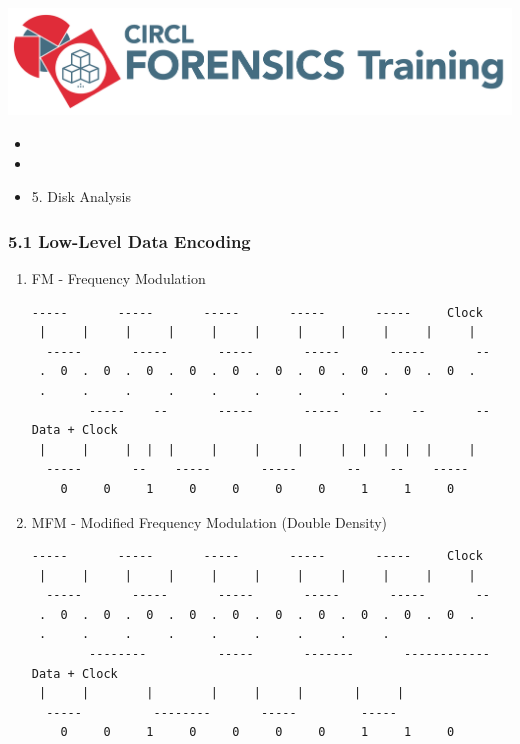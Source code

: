 %
%



\begin{frame}
    \includegraphics[scale=0.3]{images/logo-circl-Forensics.png}
    \begin{itemize}
        \item[]
        \item[]
        \item[] 5. Disk Analysis
    \end{itemize}
\end{frame}


\begin{frame}[fragile]
  \frametitle{5.1 Low-Level Data Encoding}
        \begin{enumerate}
            \item FM - Frequency Modulation
\begin{lstlisting}[basicstyle=\tiny]
        -----       -----       -----       -----       -----     Clock
 |     |     |     |     |     |     |     |     |     |     |
  -----       -----       -----       -----       -----       --
 .  0  .  0  .  0  .  0  .  0  .  0  .  0  .  0  .  0  .  0  .  
 .     .     .     .     .     .     .     .     .
        -----    --       -----       -----    --    --       --  Data + Clock
 |     |     |  |  |     |     |     |     |  |  |  |  |     |
  -----       --    -----       -----       --    --    -----
    0     0     1     0     0     0     0     1     1     0
\end{lstlisting}
	    \item MFM - Modified Frequency Modulation (Double Density)
\begin{lstlisting}[basicstyle=\tiny]
        -----       -----       -----       -----       -----     Clock
 |     |     |     |     |     |     |     |     |     |     |
  -----       -----       -----       -----       -----       --
 .  0  .  0  .  0  .  0  .  0  .  0  .  0  .  0  .  0  .  0  .  
 .     .     .     .     .     .     .     .     .
        --------          -----       -------       ------------  Data + Clock
 |     |        |        |     |     |       |     |
  -----          --------       -----         -----
    0     0     1     0     0     0     0     1     1     0
\end{lstlisting}
        \end{enumerate}
\end{frame}


